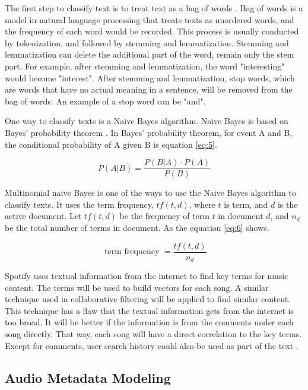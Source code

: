 The first step to classify text is to treat text as a bag of words \cite{Brilis2012}. Bag of words is a model in natural language processing that treats texts as unordered words, and the frequency of each word would be recorded. This process is usually conducted by tokenization, and followed by stemming and lemmatization. Stemming and lemmatization can delete the additional part of the word, remain only the stem part. For example, after stemming and lemmatization, the word "interesting" would become "interest". After stemming and lemmatization, stop words, which are words that have no actual meaning in a sentence, will be removed from the bag of words. An example of a stop word can be "and".

One way to classify texts is a Naive Bayes algorithm. Naive Bayes is based on Bayes’ probability theorem \cite{DBLP:journals/corr/Raschka14}. In Bayes’ probability theorem, for event A and B, the conditional probability of A given B is equation \eqref{eq:5}.

\begin{equation}
  P(A | B)=\frac{P(B | A) \cdot P(A)}{P(B)}
  \label{eq:5}
\end{equation}

Multinomial naive Bayes is one of the ways to use the Naive Bayes algorithm to classify texts. It uses the term frequency, $tf(t,d)$, where $t$ is term, and $d$ is the active document. Let $tf(t,d)$ be the frequency of term $t$ in document $d$, and $n_{d}$ be the total number of terms in document. As the equation \eqref{eq:6} shows.

\begin{equation}
  \text { term frequency }=\frac{t f(t, d)}{n_{d}}
  \label{eq:6}
\end{equation}

Spotify uses textual information from the internet to find key terms for music content. The terms will be used to build vectors for each song. A similar technique used in collaborative filtering will be applied to find similar content. This technique has a flaw that the textual information gets from the internet is too broad. It will be better if the information is from the comments under each song directly. That way, each song will have a direct correlation to the key terms. Except for comments, user search history could also be used as part of the text \cite{Bu2010}.

\subsection{Audio Metadata Modeling}

